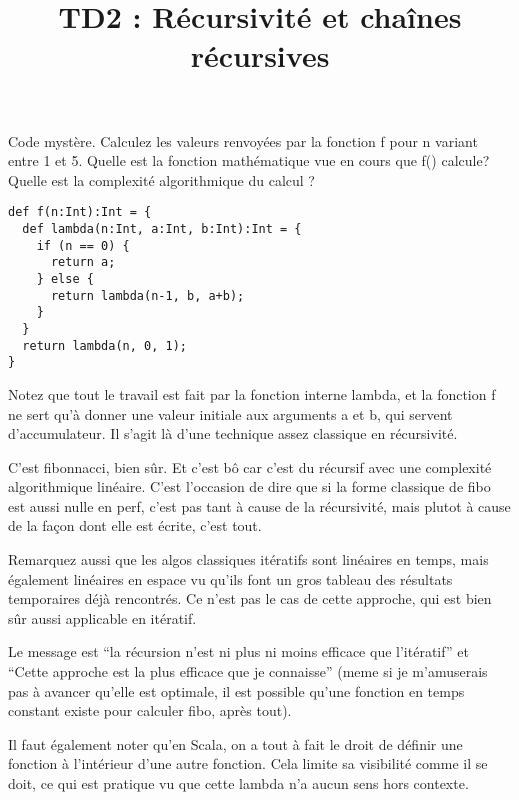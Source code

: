 \documentclass[10pt]{article}\usepackage[nu]{esial}
\title{TD2 : Récursivité et chaînes récursives}
\begin{document}
\maketitle

\noindent\begin{minipage}{.5\linewidth}
\Exercice Code mystère.
\Question Calculez les valeurs renvoyées par la fonction f pour n variant entre
1 et 5. 
\Question Quelle est la fonction mathématique vue en cours que f() calcule?
\Question Quelle est la complexité algorithmique du calcul ? 
\end{minipage}\hfill\begin{minipage}{.49\linewidth}
\begin{Verbatim}[numbers=right]
def f(n:Int):Int = {
  def lambda(n:Int, a:Int, b:Int):Int = {
    if (n == 0) {
      return a;
    } else {
      return lambda(n-1, b, a+b);
    }
  }
  return lambda(n, 0, 1);
}  
\end{Verbatim}  
\end{minipage}\smallskip

Notez que tout le travail est fait par la fonction interne lambda, et la
fonction f ne sert qu'à donner une valeur initiale aux arguments a et b, qui
servent d'accumulateur. Il s'agit là d'une technique assez classique en
récursivité.

\begin{Reponse}
  C'est fibonnacci, bien sûr. Et c'est bô car c'est du récursif avec une
  complexité algorithmique linéaire. C'est l'occasion de dire que si la forme
  classique de fibo est aussi nulle en perf, c'est pas tant à cause de la
  récursivité, mais plutot à cause de la façon dont elle est écrite, c'est
  tout. 

  Remarquez aussi que les algos classiques itératifs sont linéaires en temps,
  mais également linéaires en espace vu qu'ils font un gros tableau des
  résultats temporaires déjà rencontrés. Ce n'est pas le cas de cette approche,
  qui est bien sûr aussi applicable en itératif.

  Le message est ``la récursion n'est ni plus ni moins efficace que
  l'itératif'' et ``Cette approche est la plus efficace que je connaisse''
  (meme si je m'amuserais pas à avancer qu'elle est optimale, il est possible
  qu'une fonction en temps constant existe pour calculer fibo, après tout).

  Il faut également noter qu'en Scala, on a tout à fait le droit de définir une
  fonction à l'intérieur d'une autre fonction. Cela limite sa visibilité comme
  il se doit, ce qui est pratique vu que cette lambda n'a aucun sens hors
  contexte.
\end{Reponse}
\end{document}
